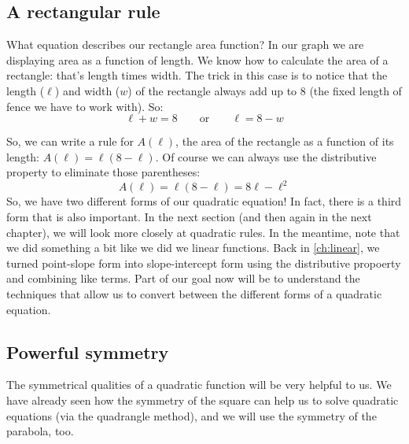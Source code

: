 
\subsection{A rectangular rule}

What equation describes our rectangle area function? In our graph we are displaying area as a function of length. We know how to calculate the area of a rectangle: that's length times width. The trick in this case is to notice that the length ($\ell$) and width ($w$) of the rectangle always add up to 8 (the fixed length of fence we have to work with). So:
\[\ell + w = 8 \qquad\text{or}\qquad \ell = 8-w\]

So, we can write a rule for $A(\ell)$, the area of the rectangle as a function of its length: $A(\ell) = \ell(8-\ell)$. Of course we can always use the distributive property to eliminate those parentheses:
\[A(\ell) = \ell(8-\ell) = 8\ell - \ell^2\]
So, we have two different forms of our quadratic equation! In fact, there is a third form that is also important. In the next section (and then again in the next chapter), we will look more closely at quadratic rules. In the meantime, note that we did something a bit like we did we linear functions. Back in \cref{ch:linear}, we turned point-slope form into slope-intercept form using the distributive propoerty and combining like terms. Part of our goal now will be to understand the techniques that allow us to convert between the different forms of a quadratic equation.


\subsection{Powerful symmetry}

The symmetrical qualities of a quadratic function will be very helpful to us. We have already seen how the symmetry of the square can help us to solve quadratic equations (via the quadrangle method), and we will use the symmetry of the parabola, too.

\begin{figure}
\end{figure}

